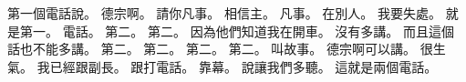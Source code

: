 \hypertarget{c01:cue:3152}{}第一個電話說。
\hypertarget{c01:cue:3153}{}德宗啊。
\hypertarget{c01:cue:3154}{}請你凡事。
\hypertarget{c01:cue:3155}{}相信主。
\hypertarget{c01:cue:3156}{}凡事。
\hypertarget{c01:cue:3157}{}在別人。
\hypertarget{c01:cue:3158}{}我要失處。
\hypertarget{c01:cue:3159}{}就是第一。
\hypertarget{c01:cue:3160}{}電話。
\hypertarget{c01:cue:3161}{}第二。
\hypertarget{c01:cue:3162}{}第二。
\hypertarget{c01:cue:3163}{}因為他們知道我在開車。
\hypertarget{c01:cue:3164}{}沒有多講。
\hypertarget{c01:cue:3165}{}而且這個話也不能多講。
\hypertarget{c01:cue:3166}{}第二。
\hypertarget{c01:cue:3167}{}第二。
\hypertarget{c01:cue:3168}{}第二。
\hypertarget{c01:cue:3169}{}第二。
\hypertarget{c01:cue:3170}{}叫故事。
\hypertarget{c01:cue:3171}{}德宗啊可以講。
\hypertarget{c01:cue:3172}{}很生氣。
\hypertarget{c01:cue:3173}{}我已經跟副長。
\hypertarget{c01:cue:3174}{}跟打電話。
\hypertarget{c01:cue:3175}{}靠幕。
\hypertarget{c01:cue:3176}{}說讓我們多聽。
\hypertarget{c01:cue:3177}{}這就是兩個電話。

